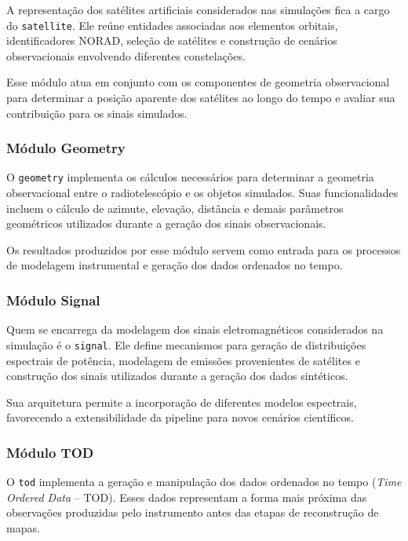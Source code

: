  A representação dos satélites artificiais considerados nas simulações fica a cargo do \texttt{satellite}. Ele reúne entidades associadas aos elementos orbitais, identificadores NORAD, seleção de satélites e construção de cenários observacionais envolvendo diferentes constelações.

Esse módulo atua em conjunto com os componentes de geometria observacional para determinar a posição aparente dos satélites ao longo do tempo e avaliar sua contribuição para os sinais simulados.

\subsubsection{Módulo Geometry}

O \texttt{geometry} implementa os cálculos necessários para determinar a geometria observacional entre o radiotelescópio e os objetos simulados. Suas funcionalidades incluem o cálculo de azimute, elevação, distância e demais parâmetros geométricos utilizados durante a geração dos sinais observacionais.

Os resultados produzidos por esse módulo servem como entrada para os processos de modelagem instrumental e geração dos dados ordenados no tempo.


\subsubsection{Módulo Signal}

Quem se encarrega da modelagem dos sinais eletromagnéticos considerados na simulação é o \texttt{signal}. Ele define mecanismos para geração de distribuições espectrais de potência, modelagem de emissões provenientes de satélites e construção dos sinais utilizados durante a geração dos dados sintéticos.

Sua arquitetura permite a incorporação de diferentes modelos espectrais, favorecendo a extensibilidade da pipeline para novos cenários científicos.

\subsubsection{Módulo TOD}

O \texttt{tod} implementa a geração e manipulação dos dados ordenados no tempo (\textit{Time Ordered Data} -- TOD). Esses dados representam a forma mais próxima das observações produzidas pelo instrumento antes das etapas de reconstrução de mapas.

